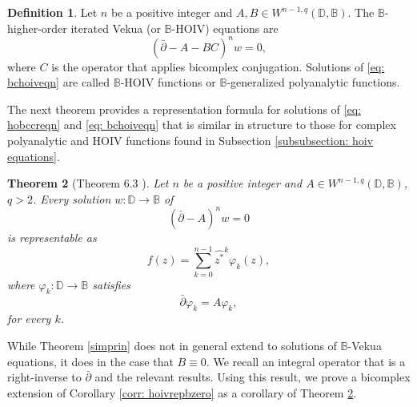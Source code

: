 \documentclass[12pt,reqno]{amsart}
\newtheorem{theorem}{Theorem}[section]
\theoremstyle{definition}
\newtheorem{deff}[theorem]{Definition}
\theoremstyle{remark}
\newcommand{\dbar}{\bar\partial}
\newcommand{\bc}{\mathbb{B}}
\newcommand{\disk}{\mathbb{D}}
\begin{document}
            \begin{deff}
                Let $n$ be a positive integer and $A, B \in W^{n-1, q}(\disk,\bc)$. The $\bc$-higher-order iterated Vekua (or $\bc$-HOIV) equations are 
                \begin{equation}\label{eq: bchoiveqn}
                    (\dbar - A - BC)^n w = 0,
                \end{equation}
                where $C$ is the operator that applies bicomplex conjugation. Solutions of \eqref{eq: bchoiveqn} are called $\bc$-HOIV functions or $\bc$-generalized polyanalytic functions.   
            \end{deff}

            The next theorem provides a representation formula for solutions of \eqref{eq: hobccreqn} and \eqref{eq: bchoiveqn} that is similar in structure to those for complex polyanalytic and HOIV functions found in Subsection \ref{subsubsection: hoiv equations}.

            \begin{theorem}[Theorem 6.3 \cite{BCHoiv}]\label{thm: 6point3BCHoiv}
                Let $n$ be a positive integer and $A \in W^{n-1, q}(\disk,\bc)$, $q>2$. Every solution $w: \disk \to\bc$ of 
                \[
                    (\dbar- A)^n w = 0
                \]
                is representable as 
                \[
                    f(z) = \sum_{k=0}^{n-1} \widehat{z^*}^k \varphi_k(z),
                \]
                where $\varphi_k:\disk\to\bc$ satisfies
                \[
                    \dbar \varphi_k = A\varphi_k,
                \]
                for every $k$. 
            \end{theorem}

            While Theorem \ref{simprin} does not in general extend to solutions of $\bc$-Vekua equations, it does in the case that $B\equiv 0 $. We recall an integral operator that is a right-inverse to $\dbar$ and the relevant results. Using this result, we prove a bicomplex extension of Corollary \ref{corr: hoivrepbzero} as a corollary of Theorem \ref{thm: 6point3BCHoiv}. 
\end{document}
